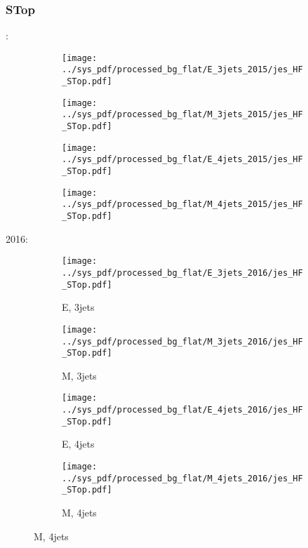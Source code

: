 \documentclass{beamer}
\begin{document}
\begin{frame}
\frametitle{STop}
\fontsize{5}{1}:
\begin{figure}
\centering
\begin{subfigure}[b]{0.24\textwidth}
\texttt{[image: ../sys\_pdf/processed\_bg\_flat/E\_3jets\_2015/jes\_HF\_STop.pdf]}
\end{subfigure}
\begin{subfigure}[b]{0.24\textwidth}
\texttt{[image: ../sys\_pdf/processed\_bg\_flat/M\_3jets\_2015/jes\_HF\_STop.pdf]}
\end{subfigure}
\begin{subfigure}[b]{0.24\textwidth}
\texttt{[image: ../sys\_pdf/processed\_bg\_flat/E\_4jets\_2015/jes\_HF\_STop.pdf]}
\end{subfigure}
\begin{subfigure}[b]{0.24\textwidth}
\texttt{[image: ../sys\_pdf/processed\_bg\_flat/M\_4jets\_2015/jes\_HF\_STop.pdf]}
\end{subfigure}
\end{figure}
2016:
\begin{figure}
\centering
\begin{subfigure}[b]{0.24\textwidth}
\texttt{[image: ../sys\_pdf/processed\_bg\_flat/E\_3jets\_2016/jes\_HF\_STop.pdf]}
\captionsetup{font=tiny}
\caption{E, 3jets}
\end{subfigure}
\begin{subfigure}[b]{0.24\textwidth}
\texttt{[image: ../sys\_pdf/processed\_bg\_flat/M\_3jets\_2016/jes\_HF\_STop.pdf]}
\captionsetup{font=tiny}
\caption{M, 3jets}
\end{subfigure}
\begin{subfigure}[b]{0.24\textwidth}
\texttt{[image: ../sys\_pdf/processed\_bg\_flat/E\_4jets\_2016/jes\_HF\_STop.pdf]}
\captionsetup{font=tiny}
\caption{E, 4jets}
\end{subfigure}
\begin{subfigure}[b]{0.24\textwidth}
\texttt{[image: ../sys\_pdf/processed\_bg\_flat/M\_4jets\_2016/jes\_HF\_STop.pdf]}
\captionsetup{font=tiny}
\caption{M, 4jets}
\end{subfigure}
\end{figure}
\end{frame}
\end{document}
